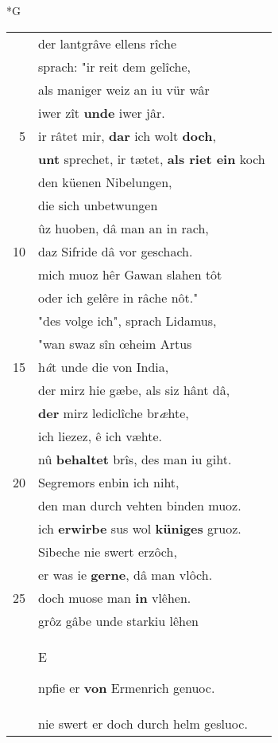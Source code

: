 \documentclass[8pt,a4paper,notitlepage]{article}
\begin{document}
\begin{table}[ht]
\begin{minipage}[t]{0.5\linewidth}
\small
\begin{center}*G
\end{center}
\begin{tabular}{rl}
 & der lantgrâve ellens rîche\\ 
 & sprach: "ir reit dem gelîche,\\ 
 & als maniger weiz an iu vür wâr\\ 
 & iwer zît \textbf{unde} iwer jâr.\\ 
5 & ir râtet mir, \textbf{dar} ich wolt \textbf{doch},\\ 
 & \textbf{unt} sprechet, ir tætet, \textbf{als riet ein} koch\\ 
 & den küenen Nibelungen,\\ 
 & die sich unbetwungen\\ 
 & ûz huoben, dâ man an in rach,\\ 
10 & daz Sifride dâ vor geschach.\\ 
 & mich muoz hêr Gawan slahen tôt\\ 
 & oder ich gelêre in râche nôt."\\ 
 & "des volge ich", sprach Lidamus,\\ 
 & "wan swaz sîn œheim Artus\\ 
15 & h\textit{â}t unde die von India,\\ 
 & der mirz hie gæbe, als siz hânt dâ,\\ 
 & \textbf{der} mirz lediclîche br\textit{æ}hte,\\ 
 & ich liezez, ê ich væhte.\\ 
 & nû \textbf{behaltet} brîs, des man iu giht.\\ 
20 & Segremors enbin ich niht,\\ 
 & den man durch vehten binden muoz.\\ 
 & ich \textbf{erwirbe} sus wol \textbf{küniges} gruoz.\\ 
 & Sibeche nie swert erzôch,\\ 
 & er was ie \textbf{gerne}, dâ man vlôch.\\ 
25 & doch muose man \textbf{in} vlêhen.\\ 
 & grôz gâbe unde starkiu lêhen\\ 
 & \begin{large}E\end{large}npfie er \textbf{von} Ermenrich genuoc.\\ 
 & nie swert er doch durch helm gesluoc.\\ 

\end{tabular}
\end{minipage}
\end{table}
\end{document}
